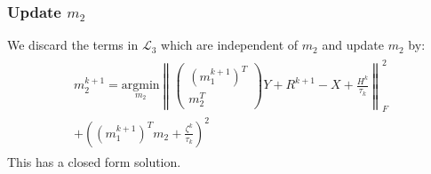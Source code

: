 \documentclass[10pt,twocolumn,letterpaper]{article}
\begin{document}
\subsubsection{Update $m_2$}
We discard the terms in $\mathcal{L}_{3}$ which are independent of
$m_2$ and update $m_2$ by:
\begin{eqnarray}
\begin{array}{c}
m_2^{k+1} = \underset{m_2}{\text{argmin}}{\left\| \left(
\begin{array}{c} \left(m_1^{k+1}\right)^T \\  m_2^T \end{array}
\right) Y + R^{k+1} - X + \frac{H^k}{\tau_k} \right\|_F^2} \\
\nonumber { + \left( \left(
m_1^{k+1}\right)^Tm_2+\frac{\zeta^k}{\tau_k}\right)^2}
\end{array}
\label{eq:updatem2}
\end{eqnarray}
This has a closed form solution.
\end{document}
